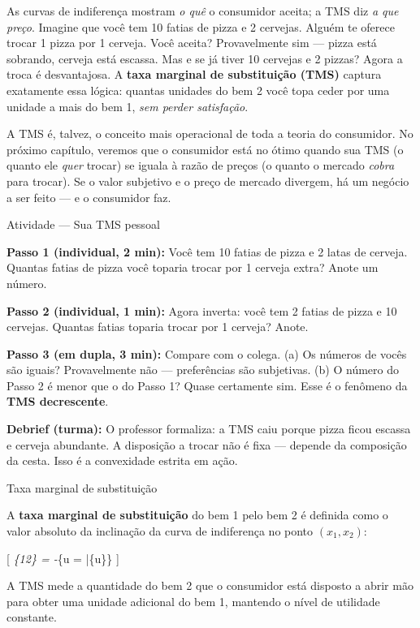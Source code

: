 \documentclass[11pt,twoside,openright]{book}
\begin{document}
As curvas de indiferença mostram \emph{o quê} o consumidor aceita; a TMS
diz \emph{a que preço}. Imagine que você tem 10 fatias de pizza e 2
cervejas. Alguém te oferece trocar 1 pizza por 1 cerveja. Você aceita?
Provavelmente sim --- pizza está sobrando, cerveja está escassa. Mas e
se já tiver 10 cervejas e 2 pizzas? Agora a troca é desvantajosa. A
\textbf{taxa marginal de substituição (TMS)} captura exatamente essa
lógica: quantas unidades do bem 2 você topa ceder por uma unidade a mais
do bem 1, \emph{sem perder satisfação}.

A TMS é, talvez, o conceito mais operacional de toda a teoria do
consumidor. No próximo capítulo, veremos que o consumidor está no ótimo
quando sua TMS (o quanto ele \emph{quer} trocar) se iguala à razão de
preços (o quanto o mercado \emph{cobra} para trocar). Se o valor
subjetivo e o preço de mercado divergem, há um negócio a ser feito --- e
o consumidor faz.

\begin{classroombox}{Atividade — Sua TMS pessoal}

\textbf{Passo 1 (individual, 2 min):} Você tem 10 fatias de pizza e 2
latas de cerveja. Quantas fatias de pizza você toparia trocar por 1
cerveja extra? Anote um número.

\textbf{Passo 2 (individual, 1 min):} Agora inverta: você tem 2 fatias
de pizza e 10 cervejas. Quantas fatias toparia trocar por 1 cerveja?
Anote.

\textbf{Passo 3 (em dupla, 3 min):} Compare com o colega. (a) Os números
de vocês são iguais? Provavelmente não --- preferências são subjetivas.
(b) O número do Passo 2 é menor que o do Passo 1? Quase certamente sim.
Esse é o fenômeno da \textbf{TMS decrescente}.

\textbf{Debrief (turma):} O professor formaliza: a TMS caiu porque pizza
ficou escassa e cerveja abundante. A disposição a trocar não é fixa ---
depende da composição da cesta. Isso é a convexidade estrita em ação.

\end{classroombox}

\begin{definitionbox}{Taxa marginal de substituição}

A \textbf{taxa marginal de substituição} do bem 1 pelo bem 2 é definida
como o valor absoluto da inclinação da curva de indiferença no ponto
\((x_1, x_2)\):

{[} \emph{\{12\} = -\bigg\textbar{}}\{u =
\bar\{u\}\} \label{eq:3.4.2}  {]}

A TMS mede a quantidade do bem 2 que o consumidor está disposto a abrir
mão para obter uma unidade adicional do bem 1, mantendo o nível de
utilidade constante.

\end{definitionbox}
\end{document}
